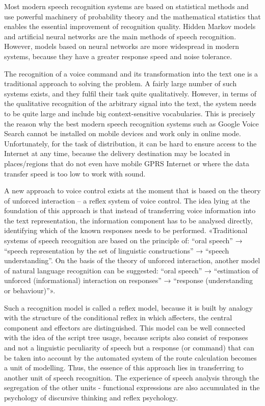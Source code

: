 Most modern speech recognition systems are based on statistical methods and use powerful machinery of probability theory and the mathematical statistics that enables the essential improvement of recognition quality. Hidden Markov models and artificial neural networks are the main methods of speech recognition. However, models based on neural networks are more widespread in modern systems, because they have a greater response speed and noise tolerance.

The recognition of a voice command and its transformation into the text one is a traditional approach to solving the problem. A fairly large number of such systems exists, and they fulfil their task quite qualitatively. However, in terms of the qualitative recognition of the arbitrary signal into the text, the system needs to be quite large and include big context-sensitive vocabularies. This is precisely the reason why the best modern speech recognition systems such as Google Voice Search cannot be installed on mobile devices and work only in online mode. Unfortunately, for the task of distribution, it can be hard to ensure access to the Internet at any time, because the delivery destination may be located in places/regions that do not even have mobile GPRS Internet or where the data transfer speed is too low to work with sound. 

A new approach to voice control exists at the moment that is based on the theory of unforced interaction – a reflex system of voice control. The idea lying at the foundation of this approach is that instead of transferring voice information into the text representation, the information component has to be analysed directly, identifying which of the known responses needs to be performed. «Traditional systems of speech recognition are based on the principle of: “oral speech” → “speech representation by the set of linguistic constructions” → “speech understanding”. On the basis of the theory of unforced interaction, another model of natural language recognition can be suggested: “oral speech” → “estimation of unforced (informational) interaction on responses” → “response (understanding or behaviour)”». 

Such a recognition model is called a reflex model, because it is built by analogy with the structure of the conditional reflex in which affecters, the central component and effectors are distinguished. This model can be well connected with the idea of the script tree usage, because scripts also consist of responses and not a linguistic peculiarity of speech but a response (or command) that can be taken into account by the automated system of the route calculation becomes a unit of modelling. Thus, the essence of this approach lies in transferring to another unit of speech recognition. The experience of speech analysis through the segregation of the other units - functional expressions are also accumulated in the psychology of discursive thinking and reflex psychology. 

